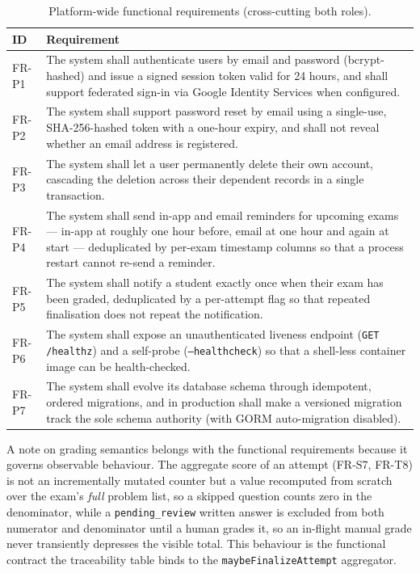 \begin{table}[htbp]
\centering
\caption{Platform-wide functional requirements (cross-cutting both roles).}
\label{tab:fr-platform}
\small
\begin{tabularx}{\textwidth}{@{}L{1.6cm} X@{}}
\toprule
\textbf{ID} & \textbf{Requirement} \\
\midrule
FR-P1 & The system shall authenticate users by email and password (bcrypt-hashed) and
issue a signed session token valid for 24 hours, and shall support federated sign-in via
Google Identity Services when configured. \\
FR-P2 & The system shall support password reset by email using a single-use, SHA-256-hashed
token with a one-hour expiry, and shall not reveal whether an email address is registered. \\
FR-P3 & The system shall let a user permanently delete their own account, cascading the
deletion across their dependent records in a single transaction. \\
FR-P4 & The system shall send in-app and email reminders for upcoming exams --- in-app at
roughly one hour before, email at one hour and again at start --- deduplicated by
per-exam timestamp columns so that a process restart cannot re-send a reminder. \\
FR-P5 & The system shall notify a student exactly once when their exam has been graded,
deduplicated by a per-attempt flag so that repeated finalisation does not repeat the
notification. \\
FR-P6 & The system shall expose an unauthenticated liveness endpoint (\texttt{GET
/healthz}) and a self-probe (\texttt{--healthcheck}) so that a shell-less container image
can be health-checked. \\
FR-P7 & The system shall evolve its database schema through idempotent, ordered
migrations, and in production shall make a versioned migration track the sole schema
authority (with GORM auto-migration disabled). \\
\bottomrule
\end{tabularx}
\end{table}

A note on grading semantics belongs with the functional requirements because it governs
observable behaviour. The aggregate score of an attempt (FR-S7, FR-T8) is not an
incrementally mutated counter but a value recomputed from scratch over the exam's
\emph{full} problem list, so a skipped question counts zero in the denominator, while a
\texttt{pending\_review} written answer is excluded from both numerator and denominator
until a human grades it, so an in-flight manual grade never transiently depresses the
visible total. This behaviour is the functional contract the traceability table binds to
the \texttt{maybeFinalizeAttempt} aggregator.


